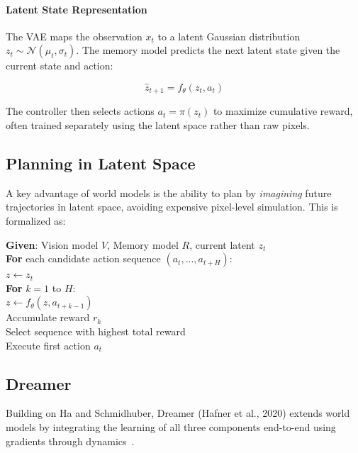 \documentclass{tufte-handout}
\begin{document}
\paragraph{Latent State Representation}
The VAE maps the observation $x_t$ to a latent Gaussian distribution $z_t \sim
\mathcal{N}(\mu_t, \sigma_t)$. The memory model predicts the next latent state given the
current state and action:

\begin{equation}
    \hat{z}_{t+1} = f_\theta(z_t, a_t)
    \label{eq:pred}
\end{equation}

The controller then selects actions $a_t = \pi(z_t)$ to maximize cumulative reward, often
trained separately using the latent space rather than raw pixels.

\subsection{Planning in Latent Space}

A key advantage of world models is the ability to plan by \textit{imagining} future trajectories
in latent space, avoiding expensive pixel-level simulation. This is formalized as:

\begin{algorithm}[h]
    \caption{Latent Planning with World Model}
        \textbf{Given}: Vision model $V$, Memory model $R$, current latent $z_t$ \\
        \textbf{For} each candidate action sequence $(a_t, ..., a_{t+H})$: \\
        \quad $z \leftarrow z_t$ \\
        \quad \textbf{For} $k = 1$ to $H$: \\
        \quad\quad $z \leftarrow f_\theta(z, a_{t+k-1})$ \\
        \quad\quad Accumulate reward $r_k$ \\
        \quad Select sequence with highest total reward \\
        \quad Execute first action $a_t$
\end{algorithm}

\subsection{Dreamer}

Building on Ha and Schmidhuber, Dreamer (Hafner et al., 2020) extends world models by
integrating the learning of all three components end-to-end using gradients through
dynamics~\nocite{hafner2020}.
\end{document}
